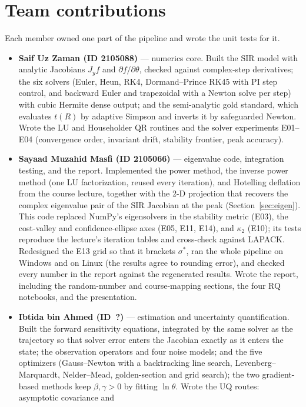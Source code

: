 \section{Team contributions}
Each member owned one part of the pipeline and wrote the unit tests for it.
\begin{itemize}
  \item \textbf{Saif Uz Zaman (ID 2105088)} --- numerics core. Built the SIR model with analytic Jacobians
    $J_y f$ and $\partial f/\partial\theta$, checked against complex-step derivatives; the six
    solvers (Euler, Heun, RK4, Dormand--Prince RK45 with PI step control, and backward Euler and
    trapezoidal with a Newton solve per step) with cubic Hermite dense output; and the
    semi-analytic gold standard, which evaluates $t(R)$ by adaptive Simpson and inverts it by
    safeguarded Newton. Wrote the LU and Householder QR routines and the solver experiments
    E01--E04 (convergence order, invariant drift, stability frontier, peak accuracy).
  \item \textbf{Sayaad Muzahid Masfi (ID 2105066)} --- eigenvalue code, integration testing, and the report.
    Implemented the power method, the inverse power method (one LU factorization, reused every
    iteration), and Hotelling deflation from the course lecture, together with the 2-D projection
    that recovers the complex eigenvalue pair of the SIR Jacobian at the peak
    (Section~\ref{sec:eigen}). This code replaced NumPy's eigensolvers in the stability metric
    (E03), the cost-valley and confidence-ellipse axes (E05, E11, E14), and $\kappa_2$ (E10); its
    tests reproduce the lecture's iteration tables and cross-check against LAPACK. Redesigned the
    E13 grid so that it brackets $\sigma^*$, ran the whole pipeline on Windows and on Linux (the
    results agree to rounding error), and checked every number in the report against the
    regenerated results. Wrote the report, including the random-number and course-mapping
    sections, the four RQ notebooks, and the presentation.
  \item \textbf{Ibtida bin Ahmed (ID~?)} --- estimation and uncertainty quantification. Built the
    forward sensitivity equations, integrated by the same solver as the trajectory so that solver
    error enters the Jacobian exactly as it enters the state; the observation operators and four
    noise models; and the five optimizers (Gauss--Newton with a backtracking line search,
    Levenberg--Marquardt, Nelder--Mead, golden-section and grid search); the two gradient-based
    methods keep $\beta, \gamma > 0$ by fitting $\ln\theta$. Wrote the UQ routes: asymptotic covariance and

\end{itemize}
